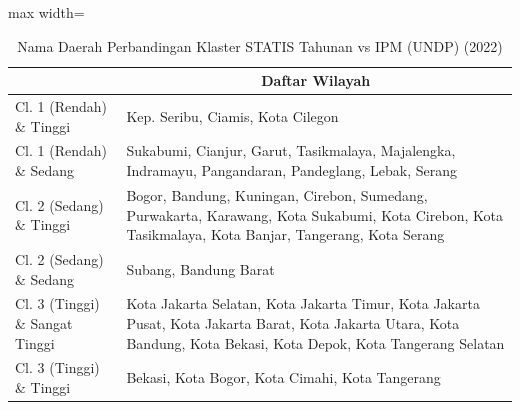 \begin{table}[H]
\centering
\caption{Nama Daerah Perbandingan Klaster STATIS Tahunan vs IPM (UNDP) (2022)} \label{tab:app1statis_ipm_name_2022}
\begin{adjustbox}{max width=\textwidth}
\begin{tabular}{|>{\centering\arraybackslash}p{4cm}|p{10cm}|}
\hline
\multicolumn{1}{|c|}{\textbf{Kategori}} & \multicolumn{1}{c|}{\textbf{Daftar Wilayah}} \\
\hline
Cl. 1 (Rendah) \& Tinggi & Kep. Seribu, Ciamis, Kota Cilegon \\
\hline
Cl. 1 (Rendah) \& Sedang & Sukabumi, Cianjur, Garut, Tasikmalaya, Majalengka, Indramayu, Pangandaran, Pandeglang, Lebak, Serang \\
\hline
Cl. 2 (Sedang) \& Tinggi & Bogor, Bandung, Kuningan, Cirebon, Sumedang, Purwakarta, Karawang, Kota Sukabumi, Kota Cirebon, Kota Tasikmalaya, Kota Banjar, Tangerang, Kota Serang \\
\hline
Cl. 2 (Sedang) \& Sedang & Subang, Bandung Barat \\
\hline
Cl. 3 (Tinggi) \& Sangat Tinggi & Kota Jakarta Selatan, Kota Jakarta Timur, Kota Jakarta Pusat, Kota Jakarta Barat, Kota Jakarta Utara, Kota Bandung, Kota Bekasi, Kota Depok, Kota Tangerang Selatan \\
\hline
Cl. 3 (Tinggi) \& Tinggi & Bekasi, Kota Bogor, Kota Cimahi, Kota Tangerang \\
\hline
\end{tabular}
\end{adjustbox}
\end{table}